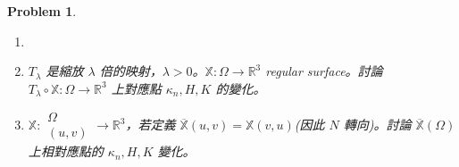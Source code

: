 \documentclass[10pt,a4paper]{article}
\newcounter{theProblemCounter}
\newtheorem{problem}[theProblemCounter]{Problem}
\begin{document}
\setcounter{theProblemCounter}{6}
\begin{problem}
\begin{enumerate}
\item[]
\item[(a)] $T_\lambda$ 是縮放 $\lambda$ 倍的映射，$\lambda>0$。$\mathbb{X}:\Omega\to \mathbb{R}^3$ regular surface。討論 $T_\lambda\circ \mathbb{X}:\Omega\to\mathbb{R}^3$ 上對應點 $\kappa_n, H, K$ 的變化。
\item[(b)] $\mathbb{X}:\begin{array}{c}\Omega\\(u,v)\end{array}\to \mathbb{R}^3$，若定義 $\overline{\mathbb{X}}(u, v)= \mathbb{X}(v, u)$(因此 $N$ 轉向)。討論 $\overline{\mathbb{X}}(\Omega)$ 上相對應點的 $\kappa_n, H, K$ 變化。 %
\end{enumerate}
\end{problem}
\end{document}
